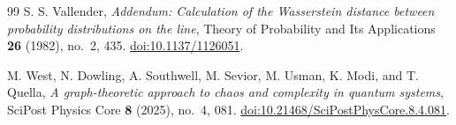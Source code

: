 \documentclass[twoside,10pt]{article}
\numberwithin{equation}{section}
\theoremstyle{slbody}
\theoremstyle{definition}
\theoremstyle{remark}
\newcommand{\1}{\mathbf{1}}
\begin{document}
\begin{thebibliography}{99}
S. S. Vallender,
\emph{Addendum: Calculation of the Wasserstein distance between probability
distributions on the line},
Theory of Probability and Its Applications \textbf{26} (1982), no.~2, 435.
\href{https://doi.org/10.1137/1126051}{doi:10.1137/1126051}.

M. West, N. Dowling, A. Southwell, M. Sevior, M. Usman, K. Modi, and T. Quella,
\emph{A graph-theoretic approach to chaos and complexity in quantum systems},
SciPost Physics Core \textbf{8} (2025), no.~4, 081.
\href{https://doi.org/10.21468/SciPostPhysCore.8.4.081}%
{doi:10.21468/SciPostPhysCore.8.4.081}.

\end{thebibliography}
\end{document}
